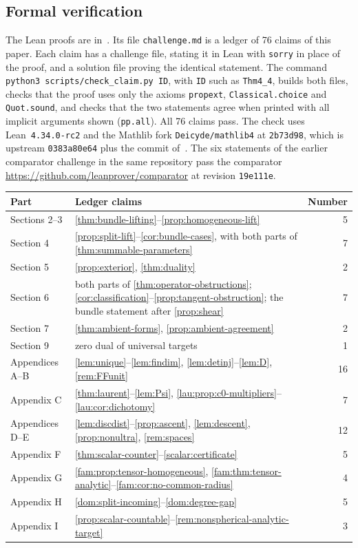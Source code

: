 \documentclass[11pt]{amsart}
\theoremstyle{definition}
\theoremstyle{remark}
\numberwithin{equation}{section}
\begin{document}
\subsection*{Formal verification}
The Lean proofs are in~\cite{LeanP}. Its file
\texttt{challenge.md} is a ledger of 76 claims of this paper. Each claim has a challenge file, stating it in Lean with
\texttt{sorry} in place of the proof, and a solution file proving the identical statement. The command
\texttt{python3 scripts/check\_claim.py ID}, with \texttt{ID} such as \texttt{Thm4\_4}, builds both
files, checks that the proof uses only the axioms \texttt{propext}, \texttt{Classical.choice} and
\texttt{Quot.sound}, and checks that the two statements agree when printed with all implicit arguments shown (\texttt{pp.all}). All 76 claims
pass. The check uses Lean~\texttt{4.34.0-rc2} and the Mathlib fork \texttt{Deicyde/mathlib4} at
\texttt{2b73d98}, which is upstream \texttt{0383a80e64} plus the commit of~\cite{PR}. The six
statements of the earlier comparator challenge in the same repository pass the comparator
\url{https://github.com/leanprover/comparator} at revision \texttt{19e111e}.

\begin{center}
\small
\begin{tabular}{lp{}r}
\hline
Part & Ledger claims & Number\\
\hline
Sections 2--3 & \ref{thm:bundle-lifting}--\ref{prop:homogeneous-lift} & 5\\
Section 4 & \ref{prop:split-lift}--\ref{cor:bundle-cases}, with both parts of \ref{thm:summable-parameters} & 7\\
Section 5 & \ref{prop:exterior}, \ref{thm:duality} & 2\\
Section 6 & both parts of \ref{thm:operator-obstructions}; \ref{cor:classification}--\ref{prop:tangent-obstruction}; the bundle statement after \ref{prop:shear} & 7\\
Section 7 & \ref{thm:ambient-forms}, \ref{prop:ambient-agreement} & 2\\
Section 9 & zero dual of universal targets & 1\\
Appendices A--B & \ref{lem:unique}--\ref{lem:findim}, \ref{lem:detinj}--\ref{lem:D}, \ref{rem:FFunit} & 16\\
Appendix C & \ref{thm:laurent}--\ref{lem:Psi}, \ref{lau:prop:c0-multipliers}--\ref{lau:cor:dichotomy} & 7\\
Appendices D--E & \ref{lem:discdist}--\ref{prop:ascent}, \ref{lem:descent}, \ref{prop:nonultra}, \ref{rem:spaces} & 12\\
Appendix F & \ref{thm:scalar-counter}--\ref{scalar:certificate} & 5\\
Appendix G & \ref{fam:prop:tensor-homogeneous}, \ref{fam:thm:tensor-analytic}--\ref{fam:cor:no-common-radius} & 4\\
Appendix H & \ref{dom:split-incoming}--\ref{dom:degree-gap} & 5\\
Appendix I & \ref{prop:scalar-countable}--\ref{rem:nonspherical-analytic-target} & 3\\
\hline
\end{tabular}
\end{center}
\end{document}
